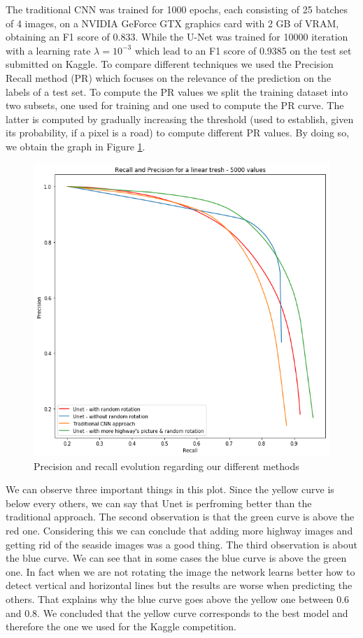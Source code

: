 \documentclass[10pt,conference,compsocconf]{IEEEtran}
\begin{document}
	The traditional CNN was trained for 1000 epochs, each consisting of 25 batches of 4 images, on a NVIDIA GeForce GTX graphics card with 2 GB of VRAM, obtaining an F1 score of 0.833. While the U-Net was trained for 10000 iteration with a learning rate $\lambda = 10^{-3}$ which lead to an F1 score of 0.9385 on the test set submitted on Kaggle.
	To compare different techniques we used the Precision Recall method (PR) which focuses on the relevance of the prediction on the labels of a test set. To compute the PR values we split the training dataset into two subsets, one used for training and one used to compute the PR curve. The latter is computed by gradually increasing the threshold (used to establish, given its probability, if a pixel is a road) to compute different PR values. By doing so, we obtain the graph in Figure \ref{fig:pr}.

	\begin{figure}[h]
		\centering
		\includegraphics[width=0.8\columnwidth]{img/pr_curve.png}
		\caption{Precision and recall evolution regarding our different methods}
		\label{fig:pr}
	\end{figure}
	
	We can observe three important things in this plot. Since the yellow curve is below every others, we can say that Unet is perfroming better than the traditional approach. The second observation is that the green curve is above the red one. Considering this we can conclude that adding more highway images and getting rid of the seaside images was a good thing. The third observation is about the blue curve. We can see that in some cases the blue curve is above the green one. In fact when we are not rotating the image the network learns better how to detect vertical and horizontal lines but the results are worse when predicting the others. That explains why the blue curve goes above the yellow one between 0.6 and 0.8. We concluded that the yellow curve corresponds to the best model and therefore the one we used for the Kaggle competition.
	
\end{document}
